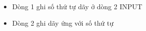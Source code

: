 \begin{itemize}
	\item Dòng 1 ghi số thứ tự dãy ở dòng 2 INPUT
	\item Dòng 2 ghi dãy ứng với số thứ tự
\end{itemize}

 